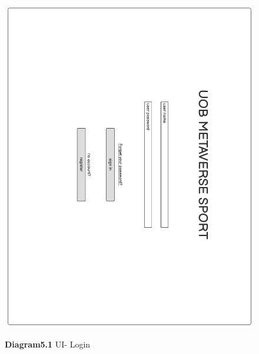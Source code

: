\documentclass[a4paper]{article}
\begin{document}
	\begin{figure}[H]
		\centering
		\caption*{\textbf{Diagram5.1} UI- Login}
		\includegraphics[width=1\textwidth]{images/UI_Final/UI_Final_1.pdf}
		\label{UI_1}
	\end{figure}
\end{document}
